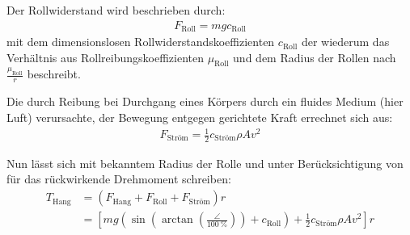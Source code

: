 	Der Rollwiderstand wird beschrieben durch:
	\begin{align}
		F_\text{Roll} = m g c_\text{Roll}
		\label{eq:rolling resistance}
	\end{align}
	mit dem dimensionslosen Rollwiderstandskoeffizienten \(c_\text{Roll}\) der wiederum das Verhältnis aus Rollreibungskoeffizienten \(\mu_\text{Roll}\) und dem Radius der Rollen nach \(\frac{\mu_\text{Roll}}{r}\) beschreibt.\par\medskip
	Die durch Reibung bei Durchgang eines Körpers durch ein fluides Medium (hier Luft) verursachte, der Bewegung entgegen gerichtete Kraft errechnet sich aus:
	\begin{align}
		F_\text{Ström} = \frac{1}{2} c_\text{Ström} \rho A v^2
		\label{eq:air drag}
	\end{align}

	Nun lässt sich mit bekanntem Radius der Rolle und unter Berücksichtigung von  für das rückwirkende Drehmoment schreiben:
	\begin{align}
		T_\text{Hang}	&= \left(F_\text{Hang} + F_\text{Roll} + F_\text{Ström}\right) r \nonumber \\
						&= \left[ m g \left( \sin\left(\arctan\left(\frac{\angle}{\qty{100}{\percent}}\right)\right) + c_\text{Roll} \right) + \frac{1}{2} c_\text{Ström} \rho A v^2 \right] r%
		\label{eq:incline plus roll plus drag torque}
	\end{align}

